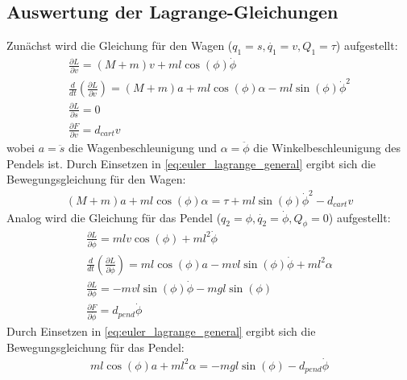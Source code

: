 \subsection{Auswertung der Lagrange-Gleichungen}
Zunächst wird die Gleichung für den Wagen ($q_1 = s, \dot{q_1} = v, Q_1 = \tau$) aufgestellt:
\begin{align}
    \frac{\partial L}{\partial v} = (M+m) v + m l \cos(\phi) \dot{\phi} \\
    \frac{d}{dt}\left(\frac{\partial L}{\partial v}\right) = (M+m)a + m l \cos(\phi) \alpha - m l \sin(\phi) \dot{\phi}^2 \\
    \frac{\partial L}{\partial s} = 0 \\
    \frac{\partial F}{\partial v} = d_{cart} v
\end{align}
wobei $a = \ddot{s}$ die Wagenbeschleunigung und $\alpha = \ddot{\phi}$ die Winkelbeschleunigung des Pendels ist.
Durch Einsetzen in \eqref{eq:euler_lagrange_general} ergibt sich die Bewegungsgleichung für den Wagen:
\begin{align}
    (M+m)a + m l \cos(\phi) \alpha = \tau + m l \sin(\phi) \dot{\phi}^2 - d_{cart} v 
    \label{eq:Bewegungsgleichung_Wagen}
\end{align}
Analog wird die Gleichung für das Pendel ($q_2 = \phi, \dot{q_2} = \dot{\phi}, Q_{\phi} = 0$) aufgestellt:
\begin{align}
    \frac{\partial L}{\partial \dot{\phi}} = m l v \cos(\phi) + m l^2 \dot{\phi} \\
    \frac{d}{dt}\left(\frac{\partial L}{\partial \dot{\phi}}\right) = m l \cos(\phi) a - m v l \sin(\phi) \dot{\phi} + m l^2 \alpha \\
    \frac{\partial L}{\partial \phi} = - m v l \sin(\phi) \dot{\phi} - m g l \sin(\phi) \\
    \frac{\partial F}{\partial \dot{\phi}} = d_{pend} \dot{\phi}
\end{align}
Durch Einsetzen in \eqref{eq:euler_lagrange_general} ergibt sich die Bewegungsgleichung für das Pendel:
\begin{align}
    m l \cos(\phi) a + m l^2 \alpha = - m g l \sin(\phi) - d_{pend} \dot{\phi} 
    \label{eq:Bewegungsgleichung_pendel}
\end{align}

